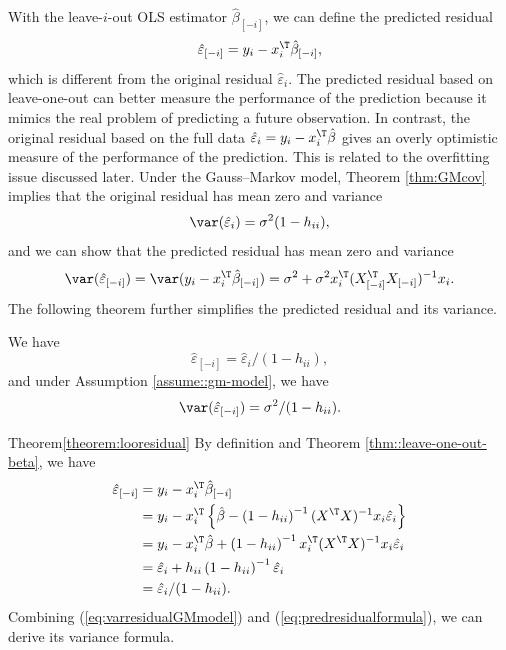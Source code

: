 With the leave-$i$-out OLS estimator $\hat{\beta}_{[-i]}$, we can
define the predicted residual
\[
\hat{\varepsilon}_{[-i]}=y_{i}-x_{i}^{\T}\hat{\beta}_{[-i]},
\]
which is different from the original residual $\hat{\varepsilon}_{i}.$ The
predicted residual based on leave-one-out can better measure the performance
of the prediction because it mimics the real problem of predicting a 
future observation. In contrast, the original residual based on the full
data $\hat{\varepsilon}_i = y_i - x_i^{\T} \hat{\beta}$ gives an overly optimistic measure of the performance of the prediction. This is related
to the overfitting issue discussed later. Under the Gauss--Markov
model, Theorem \ref{thm:GMcov} implies that the original residual
has mean zero and variance
\begin{equation}
\var(\hat{\varepsilon}_{i})=\sigma^{2}(1-h_{ii}),\label{eq:varresidualGMmodel}
\end{equation}
and we can show that the predicted residual has mean zero and variance
\begin{equation}
\var(\hat{\varepsilon}_{[-i]})=\var(y_{i}-x_{i}^{\T}\hat{\beta}_{[-i]})=\sigma^{2}+\sigma^{2}x_{i}^{\T}(X_{[-i]}^{\T}X_{[-i]})^{-1}x_{i}.\label{eq:varpresidual-1}
\end{equation}
The following theorem further simplifies the predicted residual and
its variance.

\begin{theorem}
\label{theorem:looresidual}We have 
$$
\hat{\varepsilon}_{[-i]}=\hat{\varepsilon}_{i}/(1-h_{ii}),
$$
and under Assumption \ref{assume::gm-model}, we have 
\begin{equation}
\var(\hat{\varepsilon}_{[-i]})=\sigma^{2}/(1-h_{ii}).\label{eq:varpresidual-2}
\end{equation}
\end{theorem}

\begin{myproof}{Theorem}{\ref{theorem:looresidual}}
By definition and Theorem \ref{thm::leave-one-out-beta}, we have
\begin{align}
\hat{\varepsilon}_{[-i]} & =y_{i}-x_{i}^{\T}\hat{\beta}_{[-i]}\nonumber \\
 & =y_{i}-x_{i}^{\T}\left\{ \hat{\beta}-\left(1-h_{ii}\right)^{-1}(X^{\T}X)^{-1}x_{i}\hat{\varepsilon}_{i}\right\} \nonumber \\
 & =y_{i}-x_{i}^{\T}\hat{\beta}+\left(1-h_{ii}\right)^{-1}x_{i}^{\T}(X^{\T}X)^{-1}x_{i}\hat{\varepsilon}_{i}\nonumber \\
 & =\hat{\varepsilon}_{i}+h_{ii}\left(1-h_{ii}\right)^{-1}\hat{\varepsilon}_{i}\nonumber \\
 & =\hat{\varepsilon}_{i}/(1-h_{ii})\text{.}\label{eq:predresidualformula}
\end{align}
Combining (\ref{eq:varresidualGMmodel}) and (\ref{eq:predresidualformula}), we can derive its variance formula. 
\end{myproof}


